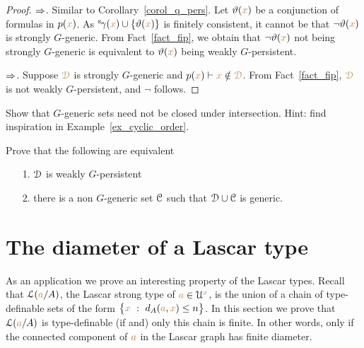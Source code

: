 \begin{proof}
  $\Rightarrow$. Similar to Corollary~\ref{corol_q_pers}.
  Let $\vartheta({\color{brown} x})$ be a conjunction of formulas in $p({\color{brown} x})$.
  As ${}^{\rm s}\kern-.2ex\gamma({\color{brown} x})\cup\{\vartheta({\color{brown} x})\}$ is finitely consistent, it cannot be that $\neg\vartheta({\color{brown} x})$ is strongly $G$-generic.
  From Fact~\ref{fact_fip}, we obtain that $\neg\vartheta({\color{brown} x})$ not being strongly $G$-generic is equivalent to $\vartheta({\color{brown} x})$ being weakly $G$-persistent.

  $\Rightarrow$. 
  Suppose ${\color{brown}\EuScript D}$ is strongly $G$-generic and $p({\color{brown} x})\vdash{\color{brown}x}\notin{\color{brown}\EuScript D}$.
  From Fact~\ref{fact_fip}, ${\color{brown}\EuScript D}$ is not weakly $G$-persistent, and $\neg$ follows.
\end{proof}


\begin{exercise}
  Show that $G$-generic sets need not be closed under intersection.
  Hint: find inspiration in Example~\ref{ex_cyclic_order}.
\end{exercise}

\begin{exercise}
  Prove that the following are equivalent
  \begin{itemize}
    \item [1.] $\EuScript D$ is weakly $G$-persistent
    \item [2.] there is a non $G$-generic set $\EuScript C$ such that $\EuScript D\cup\EuScript C$ is generic.
  \end{itemize}
\end{exercise}

\section{The diameter of a Lascar type}\label{newelski}

As an application we prove an interesting property of the Lascar types.
Recall that $\EuScript L({\color{brown} a}/A)$, the Lascar strong type of ${\color{brown} a}\in\EuScript U^{\color{brown} x}$, is the union of a chain of type-definable sets of the form $\big\{{\color{brown} x}\ :\ d_A({\color{brown} a},{\color{brown} x})\le n\big\}$.
In this section we prove that $\EuScript L({\color{brown} a}/A)$ is type-definable (if and) only this chain is finite.
In other words, only if the connected component of ${\color{brown} a}$ in the Lascar graph has finite diameter.

